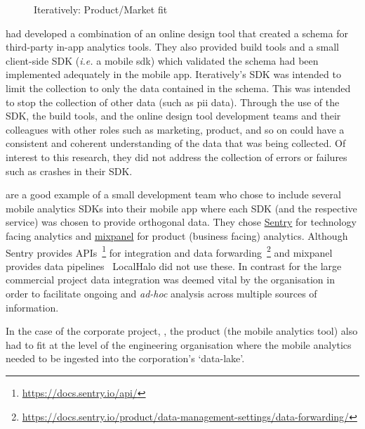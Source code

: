 \begin{figure}[htbp!]
\begin{minipage}{.45\textwidth}
  \label{fig:iteratively-dot-voting-example}
\end{minipage}
    \caption{Iteratively: Product/Market fit}
    \label{fig:iteratively-product-market-fit}
\end{figure}

 had developed a combination of an online design tool that created a schema for third-party in-app analytics tools. They also provided build tools and a small client-side SDK (\emph{i.e.} a mobile \Gls{sdk}) which validated the schema had been implemented adequately in the mobile app. %
Iteratively's SDK was intended to limit the collection to only the data contained in the schema. This was intended to stop the collection of other data (such as \Gls{pii} data). Through the use of the SDK, the build tools, and the online design tool development teams and their colleagues with other roles such as marketing, product, and so on could have a consistent and coherent understanding of the data that was being collected. Of interest to this research, they did not address the collection of errors or failures such as crashes in their SDK.

 are a good example of a small development team who chose to include several mobile analytics SDKs into their mobile app where each SDK (and the respective service) was chosen to provide orthogonal data. They chose \href{https://sentry.io/}{Sentry} for technology facing analytics and \href{https://mixpanel.com/}{mixpanel} for product (business facing) analytics. Although Sentry provides APIs~\footnote{\url{https://docs.sentry.io/api/}} for integration and data forwarding~\footnote{\url{https://docs.sentry.io/product/data-management-settings/data-forwarding/}} and mixpanel provides data pipelines~ LocalHalo did not use these. In contrast for the large commercial project data integration was deemed vital by the organisation in order to facilitate ongoing and \emph{ad-hoc} analysis across multiple sources of information. 

In the case of the corporate project, , the product (the mobile analytics tool) also had to fit at the level of the engineering organisation where the mobile analytics needed to be ingested into the corporation's `data-lake'. 

